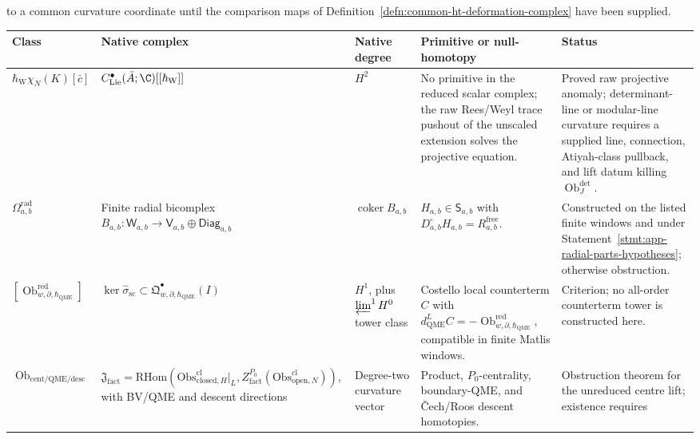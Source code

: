 \begin{thm}
to a common curvature coordinate until the comparison maps of
Definition~\ref{defn:common-ht-deformation-complex} have been supplied.
\begin{center}
\begingroup
\small
\setlength{\tabcolsep}{3pt}
\renewcommand{\arraystretch}{1.18}
\begin{tabular}{@{}>{\raggedright\arraybackslash}p{}
  >{\raggedright\arraybackslash}p{}
  >{\raggedright\arraybackslash}p{}
  >{\raggedright\arraybackslash}p{}
  >{\raggedright\arraybackslash}p{}@{}}
\hline
\textbf{Class} & \textbf{Native complex} & \textbf{Native degree}
& \textbf{Primitive or null-homotopy} & \textbf{Status}\\
\hline
\(\hbar_{\mathrm{W}}\chi_N(K)[\bar c]\) &
\(C^\bullet_{\mathrm{Lie}}(\bar A;\C)[[\hbar_{\mathrm{W}}]]\) &
\(H^2\) &
No primitive in the reduced scalar complex; the raw Rees/Weyl trace
pushout of the unscaled extension solves the projective equation. &
Proved raw projective anomaly; determinant-line or modular-line
curvature requires a supplied line, connection, Atiyah-class pullback,
and lift datum killing
\(\operatorname{Ob}^{\det}_J\).\\
\hline
\(\Omega^{\mathrm{rad}}_{a,b}\) &
Finite radial bicomplex
\(B_{a,b}\colon\mathsf W_{a,b}\to\mathsf V_{a,b}\oplus\mathsf{Diag}_{a,b}\) &
\(\operatorname{coker}B_{a,b}\) &
\(H_{a,b}\in\mathsf S_{a,b}\) with
\(D^\square_{a,b}H_{a,b}=R^{\mathrm{free}}_{a,b}\). &
Constructed on the listed finite windows and under
Statement~\ref{stmt:app-radial-parts-hypotheses}; otherwise obstruction.\\
\hline
\([\operatorname{Ob}^{\mathrm{red}}_{w,\partial,\hbar_{\mathrm{QME}}}]\) &
\(\ker\widehat\sigma_{\mathrm{sc}}\subset
\mathfrak Q^\bullet_{w,\partial,\hbar_{\mathrm{QME}}}(I)\) &
\(H^1\), plus \(\varprojlim^1 H^0\) tower class &
Costello local counterterm \(C\) with
\(d_{\mathrm{QME}}^LC=-\operatorname{Ob}^{\mathrm{red}}_{w,\partial,\hbar_{\mathrm{QME}}}\), compatible in
finite Matlis windows. &
Criterion; no all-order counterterm tower is constructed here.\\
\hline
\(\operatorname{Ob}_{\mathrm{cent/QME/desc}}\) &
\(\mathfrak J_{\mathrm{fact}}=
\mathrm{RHom}(\mathrm{Obs}^{\mathrm{cl}}_{\mathrm{closed},H}|_L,
Z^{P_0}_{\mathrm{fact}}(\mathrm{Obs}^{\mathrm{cl}}_{\mathrm{open},N}))\),
with BV/QME and descent directions &
Degree-two curvature vector &
Product, \(P_0\)-centrality, boundary-QME, and
\v Cech/Roos descent homotopies. &
Obstruction theorem for the unreduced centre lift; existence requires

\end{tabular}
\end{center}
\end{thm}
